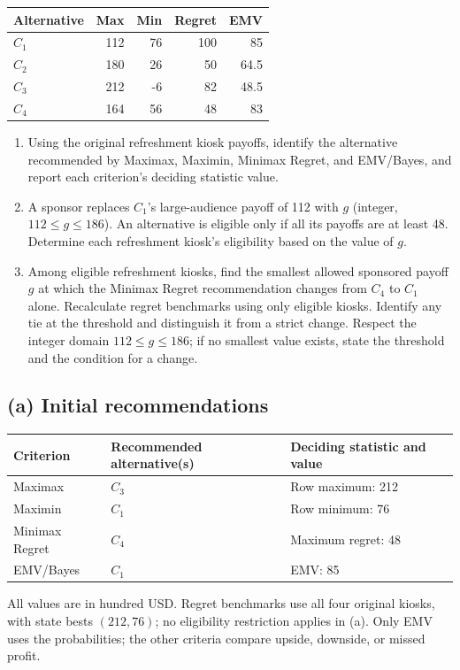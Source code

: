 \begin{center}\small\setlength{\tabcolsep}{4pt}
	\begin{tabular}{lrrrr}\toprule
		Alternative & Max & Min & Regret & EMV\\ \midrule
				$C_1$ & 112 & 76 & 100 & 85\\
		$C_2$ & 180 & 26 & 50 & 64.5\\
		$C_3$ & 212 & -6 & 82 & 48.5\\
		$C_4$ & 164 & 56 & 48 & 83\\
		\bottomrule
	\end{tabular}
\end{center}

\begin{enumerate}[label=\textbf{(\alph*)},leftmargin=*]
	\item Using the original refreshment kiosk payoffs, identify the alternative recommended by Maximax, Maximin, Minimax Regret, and EMV/Bayes, and report each criterion's deciding statistic value. 

	\item A sponsor replaces $C_1$'s large-audience payoff of 112 with $g$ (integer, $112\leq g\leq186$). An alternative is eligible only if all its payoffs are at least 48. Determine each refreshment kiosk's eligibility based on the value of $g$. 

	\item Among eligible refreshment kiosks, find the smallest allowed sponsored payoff $g$ at which the Minimax Regret recommendation changes from $C_4$ to $C_1$ alone. Recalculate regret benchmarks using only eligible kiosks. Identify any tie at the threshold and distinguish it from a strict change. Respect the integer domain $112\leq g\leq186$; if no smallest value exists, state the threshold and the condition for a change. 
\end{enumerate}
\label{sol:q2a}
\subsection*{(a) Initial recommendations }
\begin{center}
\begin{tabular}{lll}\toprule
Criterion & Recommended alternative(s) & Deciding statistic and value\\ \midrule
		Maximax & $C_3$ & Row maximum: 212\\
		Maximin & $C_1$ & Row minimum: 76\\
		Minimax Regret & $C_4$ & Maximum regret: 48\\
		EMV/Bayes & $C_1$ & EMV: 85\\
		\bottomrule\end{tabular}
\end{center}
All values are in hundred USD. Regret benchmarks use all four original kiosks, with state bests $(212,76)$; no eligibility restriction applies in (a). Only EMV uses the probabilities; the other criteria compare upside, downside, or missed profit.
\secInicio[sec:q2]



